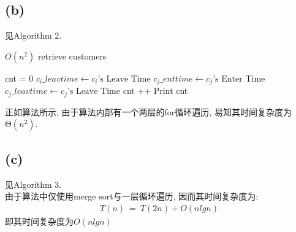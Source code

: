 \documentclass{article}
\begin{document}
\subsection{(b)}
见Algorithm 2.

\begin{algorithm}
\caption{$O(n^2)$ retrieve customers}
\begin{algorithmic}[1]
\State cnt = 0
\State $c_i\_leavtime\gets \mbox{$c_i$'s Leave Time}$
\State $c_j\_enttime\gets \mbox{$c_j$'s Enter Time}$
\State $c_j\_leavtime\gets \mbox{$c_j$'s Leave Time}$
\State cnt ++
\EndIf
\EndFor
\EndFor
\State Print cnt
\EndProcedure
\end{algorithmic}
\end{algorithm}

正如算法所示, 由于算法内部有一个两层的for循环遍历, 易知其时间复杂度为$\mbox{Θ}(n^2)$.

\subsection{(c)}
见Algorithm 3. \\
由于算法中仅使用merge sort与一层循环遍历, 因而其时间复杂度为:
\begin{align*}
T(n)\ =\ T(2n) + O(nlgn)
\end{align*}
即其时间复杂度为$O(nlgn)$
\end{document}

